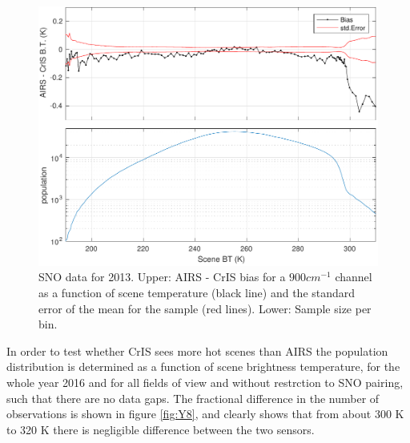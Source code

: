 \documentclass[twocolumn,10pt]{article}
\begin{document}
\begin{figure}[htb]
\centering
\includegraphics[width=\linewidth]{./figs/AC_jplSNO_900wn_bias_vs_scene.pdf}
\caption{
  SNO data for 2013. Upper: AIRS - CrIS bias for a $900 cm^{-1}$ channel as a function of scene temperature (black line) and the standard error of the mean for the sample (red lines). Lower: Sample size per bin.}
\label{fig:Y7}
\end{figure}

In order to test whether CrIS sees more hot scenes than AIRS the population distribution is determined as a function of scene brightness temperature, for the whole year 2016 and for all fields of view and without restrction to SNO pairing, such that there are no data gaps. The fractional difference in the number of observations is shown in figure \ref{fig:Y8}, and clearly shows that from about 300 K to 320 K there is negligible difference between the two sensors.  
\end{document}

